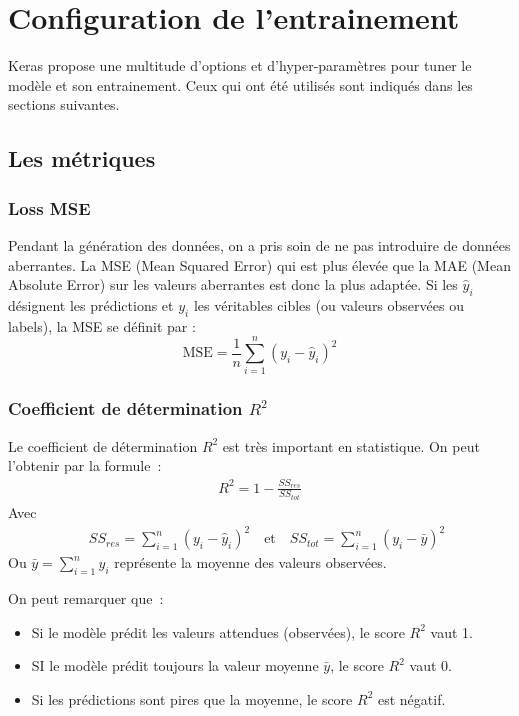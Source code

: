 \section{Configuration de l'entrainement}
Keras propose une multitude d'options et d'hyper-paramètres pour tuner le modèle et son entrainement. Ceux qui ont été utilisés sont indiqués dans les sections suivantes.


\subsection{Les métriques}

\subsubsection{Loss MSE}
Pendant la génération des données, on a pris soin de ne pas introduire de données aberrantes. La MSE (Mean Squared Error) qui est plus élevée que la MAE (Mean Absolute Error) sur les valeurs aberrantes est donc la plus adaptée. Si les $\hat{y}_i$ désignent les prédictions et $y_i$ les véritables cibles (ou valeurs observées ou labels), la MSE se définit par :
\begin{equation}
 \text{MSE} = \frac{1}{n} \sum_{i=1}^{n} \left( y_i - \hat{y}_i \right)^2
 \label{eqn:MSE}
\end{equation}

\subsubsection{Coefficient de détermination $R^2$}
\label{subsub:R2}
Le coefficient de détermination $R^2$ est très important en statistique. On peut l'obtenir par la formule :
\begin{align}
 R^2 = 1 - \frac{SS_{res}}{SS_{tot}}
 \label{eqn:R2}
\end{align}
Avec
\begin{align*}
 \quad SS_{res} =  \sum_{i=1}^{n} \left( y_i - \hat{y}_i \right)^2 \quad \text{et} \quad SS_{tot} =  \sum_{i=1}^{n} \left( y_i - \bar{y} \right)^2 
\end{align*}
Ou $ \bar{y} = \sum_{i=1}^{n} y_i $ représente la moyenne des valeurs observées.

On peut remarquer que :
\begin{itemize}
 \item Si le modèle prédit les valeurs attendues (observées), le score $R^2$ vaut 1. 
 \item SI le modèle prédit toujours la valeur moyenne $\bar{y}$, le score $R^2$ vaut 0.
 \item Si les prédictions sont pires que la moyenne, le score $R^2$ est négatif.
\end{itemize}

